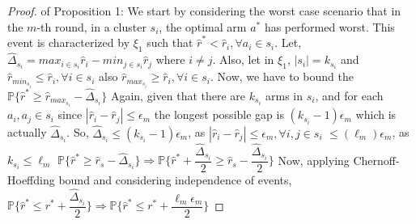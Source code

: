 \begin{proof} of Proposition 1:
\newline
We start by considering the worst case scenario that in the $m$-th round, in a cluster $s_{i}$, the optimal arm $a^{*}$ has performed worst. This event is characterized by $\xi_{1}$ such that $\hat{r}^{*}<\hat{r}_{i},\forall a_{i} \in s_{i}$. Let, $\hat{\Delta}_{s_{i}}=max_{i\in s_{i}}\hat{r}_{i}-min_{j\in s_{i}}\hat{r}_{j}$ where $i\neq j$. Also, let in $\xi_{1}$, $|s_{i}|=k_{s_{i}}$ and $\hat{r}_{min_{s_{i}}}\leq\hat{r}_{i},\forall i\in s_{i}$ also $\hat{r}_{max_{s_{i}}}\geq\hat{r}_{i},\forall i\in s_{i}$.
\newline
Now, we have to bound the $\mathbb{P}\lbrace\hat{r}^{*}\geq\hat{r}_{max_{s_{i}}} - \hat{\Delta}_{s_{i}}\rbrace$
\newline
Again, given that there are $k_{s_{i}}$ arms in $s_{i}$, and for each $a_{i},a_{j}\in s_{i}$ since $|\hat{r}_{i}-\hat{r}_{j}|\leq\epsilon_{m}$ the longest possible gap is $(k_{s_{i}}-1)\epsilon_{m}$ which is actually $\hat{\Delta}_{s_{i}}$.
\newline
So, $\hat{\Delta}_{s_{i}}\leq (k_{s_{i}}-1)\epsilon_{m}$, as $|\hat{r}_{i}-\hat{r}_{j}|\leq\epsilon_{m}, \forall i,j \in s_{i}$
\newline\hspace*{3.5em}$\leq (\ell_{m})\epsilon_{m}$, as $k_{s_{i}}\leq \ell_{m}$
\newline\hspace*{0em} $\mathbb{P}\lbrace\hat{r}^{*}\geq\hat{r}_{s} - \hat{\Delta}_{s_{i}}\rbrace\Rightarrow\mathbb{P}\lbrace\hat{r}^{*}+\dfrac{\hat{\Delta}_{s_{i}}}{2}\geq\hat{r}_{s} - \dfrac{\hat{\Delta}_{s_{i}}}{2}\rbrace$
\newline Now, applying Chernoff-Hoeffding bound and considering independence of events,
\newline $\mathbb{P}\lbrace\hat{r}^{*}\leq{r}^{*} + \dfrac{\hat{\Delta}_{s_{i}}}{2}\rbrace\Rightarrow \mathbb{P}\lbrace\hat{r}^{*}\leq{r}^{*} + \dfrac{\ell_{m}\epsilon_{m}}{2}\rbrace $

\end{proof}
